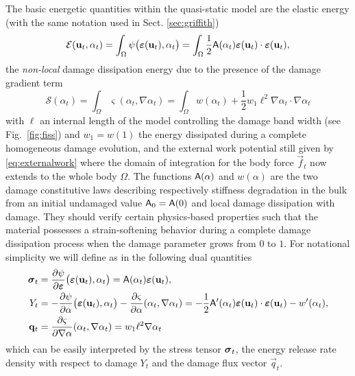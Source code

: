 The basic energetic quantities within the quasi-static model are the elastic energy (with the same notation used in Sect. \ref{sec:griffith})
\begin{equation} \label{eq:elasticG}
\mathcal{E}(\vec{u}_t,\alpha_t)=\int_\Omega\psi\bigl(\eps(\vec{u}_t),\alpha_t\bigr)=\int_\Omega\frac{1}{2}\tens{A}(\alpha_t)\eps(\vec{u}_t)\cdot\eps(\vec{u}_t),
\end{equation}
the \emph{non-local} damage dissipation energy due to the presence of the damage gradient term
\begin{equation} \label{eq:surface}
\mathcal{S}(\alpha_t)=\int_\Omega\varsigma(\alpha_t,\nabla\alpha_t)=\int_\Omega w(\alpha_t)+\frac{1}{2}w_1\ell^2\nabla\alpha_t\cdot\nabla\alpha_t
\end{equation}
with $\ell$ an internal length of the model controlling the damage band width (see Fig.~\ref{fig:fiss}) and $w_1=w(1)$ the energy dissipated during a complete homogeneous damage evolution, and the external work potential still given by \eqref{eq:externalwork} where the domain of integration for the body force $\vec{f}_t$ now extends to the whole body $\Omega$. The functions $\mathsf{A}(\alpha)$ and $w(\alpha)$ are the two damage constitutive laws describing respectively stiffness degradation in the bulk from an initial undamaged value $\mathsf{A}_0=\mathsf{A}(0)$ and local damage dissipation with damage. They should verify certain physics-based properties \cite{SicsicMarigo:2013} such that the material possesses a strain-softening behavior during a complete damage dissipation process when the damage parameter grows from $0$ to $1$. For notational simplicity we will define as in \cite{SicsicMarigo:2013} the following dual quantities
\begin{subequations}
\begin{align}
\sig_t &= \frac{\partial\psi}{\partial\eps}\bigl(\eps(\vec{u}_t),\alpha_t\bigr)=\tens{A}(\alpha_t)\eps(\vec{u}_t), \label{eq:sigt} \\
Y_t &= -\frac{\partial\psi}{\partial\alpha}\bigl(\eps(\vec{u}_t),\alpha_t\bigr)-\frac{\partial\varsigma}{\partial\alpha}(\alpha_t,\nabla\alpha_t)=-\frac{1}{2}\tens{A}'(\alpha_t)\eps(\vec{u}_t)\cdot\eps(\vec{u}_t)-w'(\alpha_t), \label{eq:Yt} \\
\vec{q}_t &= \frac{\partial\varsigma}{\partial\nabla\alpha}(\alpha_t,\nabla\alpha_t)=w_1\ell^2\nabla\alpha_t \label{eq:qt}
\end{align}
\end{subequations}
which can be easily interpreted by the stress tensor $\sig_t$, the energy release rate density with respect to damage $Y_t$ and the damage flux vector $\vec{q}_t$.

